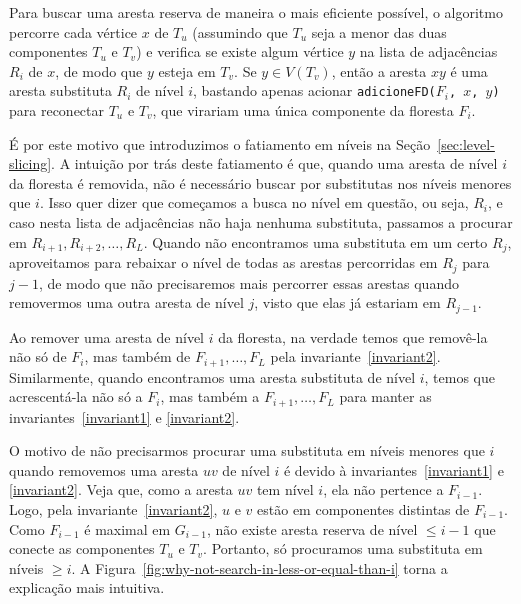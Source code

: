 Para buscar uma aresta reserva de maneira o mais eficiente possível, o algoritmo percorre cada vértice $x$ de $T_u$ (assumindo que $T_u$ seja a menor das duas componentes $T_u$ e $T_v$) e verifica se existe algum vértice $y$ na lista de adjacências $R_i$ de $x$, de modo que $y$ esteja em $T_v$. Se $y \in V(T_v)$, então a aresta $xy$ é uma aresta substituta $R_i$ de nível $i$, bastando apenas acionar \texttt{adicioneFD($F_i$, $x$, $y$)} para reconectar $T_u$ e $T_v$, que virariam uma única componente da floresta $F_i$.

É por este motivo que introduzimos o fatiamento em níveis na Seção~\ref{sec:level-slicing}. A intuição por trás deste fatiamento é que, quando uma aresta de nível $i$ da floresta é removida, não é necessário buscar por substitutas nos níveis menores que $i$. Isso quer dizer que começamos a busca no nível em questão, ou seja, $R_i$, e caso nesta lista de adjacências não haja nenhuma substituta, passamos a procurar em $R_{i+1}, R_{i + 2}, \ldots, R_L$. Quando não encontramos uma substituta em um certo $R_j$, aproveitamos para rebaixar o nível de todas as arestas percorridas em $R_j$ para $j - 1$, de modo que não precisaremos mais percorrer essas arestas quando removermos uma outra aresta de nível $j$, visto que elas já estariam em $R_{j-1}$.

Ao remover uma aresta de nível $i$ da floresta, na verdade temos que removê-la não só de $F_i$, mas também de $F_{i + 1}, \ldots, F_{L}$ pela invariante~\ref{invariant2}. Similarmente, quando encontramos uma aresta substituta de nível $i$, temos que acrescentá-la não só a $F_i$, mas também a $F_{i+1}, \ldots, F_{L}$ para manter as invariantes~\ref{invariant1} e \ref{invariant2}.

O motivo de não precisarmos procurar uma substituta em níveis menores que $i$ quando removemos uma aresta $uv$ de nível $i$ é devido à invariantes~\ref{invariant1} e \ref{invariant2}. Veja que, como a aresta $uv$ tem nível $i$, ela não pertence a $F_{i-1}$. Logo, pela invariante~\ref{invariant2}, $u$ e $v$ estão em componentes distintas de $F_{i-1}$. Como $F_{i-1}$ é maximal em $G_{i-1}$, não existe aresta reserva de nível $\leq i - 1$ que conecte as componentes $T_u$ e $T_v$. Portanto, só procuramos uma substituta em níveis $\geq i$. A Figura~\ref{fig:why-not-search-in-less-or-equal-than-i} torna a explicação mais intuitiva.

